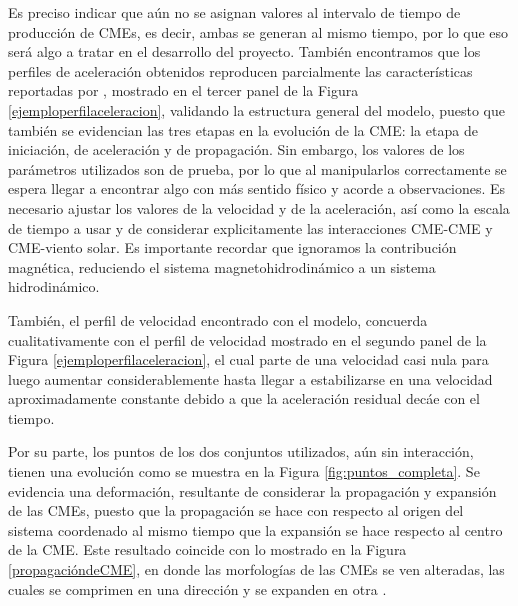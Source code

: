 Es preciso indicar que aún no se asignan valores al intervalo de tiempo de producción de CMEs, es decir, ambas se generan al mismo tiempo, por lo que eso será algo a tratar en el desarrollo del proyecto. También encontramos que los perfiles de aceleración obtenidos reproducen parcialmente las características reportadas por \textcite[e.g.,][]{gallagher-2003}, mostrado en el tercer panel de la Figura \ref{ejemploperfilaceleracion}, validando la estructura general del modelo, puesto que también se evidencian las tres etapas en la evolución de la CME: la etapa de iniciación, de aceleración y de propagación. Sin embargo, los valores de los parámetros utilizados son de prueba, por lo que al manipularlos correctamente se espera llegar a encontrar algo con más sentido físico y acorde a observaciones. Es necesario ajustar los valores de la velocidad y de la aceleración, así como la escala de tiempo a usar y de considerar explicitamente las interacciones CME-CME y CME-viento solar. Es importante recordar que ignoramos la contribución magnética, reduciendo el sistema magnetohidrodinámico a un sistema hidrodinámico.

También, el perfil de velocidad encontrado con el modelo, concuerda cualitativamente con el perfil de velocidad mostrado en el segundo panel de la Figura \ref{ejemploperfilaceleracion}, el cual parte de una velocidad casi nula para luego aumentar considerablemente hasta llegar a estabilizarse en una velocidad aproximadamente constante debido a que la aceleración residual decáe con el tiempo.

Por su parte, los puntos de los dos conjuntos utilizados, aún sin interacción, tienen una evolución como se muestra en la Figura \ref{fig:puntos_completa}. Se evidencia una deformación, resultante de considerar la propagación y expansión de las CMEs, puesto que la propagación se hace con respecto al origen del sistema coordenado al mismo tiempo que la expansión se hace respecto al centro de la CME. Este resultado coincide con lo mostrado en la Figura \ref{propagacióndeCME}, en donde las morfologías de las CMEs se ven alteradas, las cuales se comprimen en una dirección y se expanden en otra \parencite[e.g.,][]{odstrcil-2002}.

